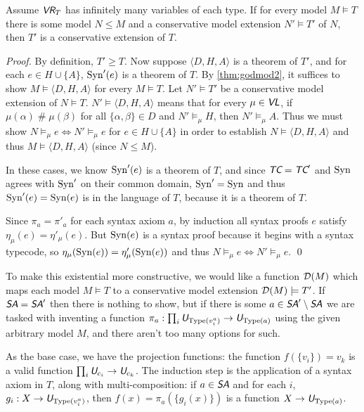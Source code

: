 \documentclass[runningheads,a4paper]{llncs}
\newcommand{\vr}{\textit{\textsf{VR}}} %
\newcommand{\tc}{\textit{\textsf{TC}}} %
\newcommand{\vl}{\textit{\textsf{VL}}} %
\newcommand{\uv}{\textit{\textsf{U}}} %
\newcommand{\sa}{\textit{\textsf{SA}}} %
\newcommand{\ang}[1]{\langle#1\rangle}
\newcommand{\type}{{\rm Type}}
\newcommand{\syn}{{\rm Syn}}
\newcommand{\fresh}{\mathbin{\#}}
\begin{document}
\begin{theorem}\label{thm:cmodel}
Assume $\vr_T$ has infinitely many variables of each type. If for every model $M\models T$ there is some model $N\le M$ and a conservative model extension $N'\models T'$ of $N$, then $T'$ is a conservative extension of $T$.
\end{theorem}
\begin{proof}By definition, $T'\ge T$. Now suppose $\ang{D,H,A}$ is a theorem of $T'$, and for each $e\in H\cup\{A\}$, $\syn'(e)$ is a theorem of $T$.  By \autoref{thm:godmod2}, it suffices to show $M\models\ang{D,H,A}$ for every $M\models T$. Let $N'\models T'$ be a conservative model extension of $N\models T$.  $N'\models\ang{D,H,A}$ means that for every $\mu\in\vl$, if $\mu(\alpha)\fresh\mu(\beta)$ for all $\{\alpha,\beta\}\in D$ and $N'\models_\mu H$, then $N'\models_\mu A$.  Thus we must show $N\models_\mu e\iff N'\models_\mu e$ for $e\in H\cup\{A\}$ in order to establish $N\models\ang{D,H,A}$ and thus $M\models\ang{D,H,A}$ (since $N\le M$).

In these cases, we know $\syn'(e)$ is a theorem of $T$, and since $\tc=\tc'$ and $\syn$ agrees with $\syn'$ on their common domain, $\syn'=\syn$ and thus $\syn'(e)=\syn(e)$ is in the language of $T$, because it is a theorem of $T$.

Since $\pi_a=\pi'_a$ for each syntax axiom $a$, by induction all syntax proofs $e$ satisfy $\eta_\mu(e)=\eta'_\mu(e)$. But $\syn(e)$ is a syntax proof because it begins with a syntax typecode, so $\eta_\mu(\syn(e))=\eta'_\mu(\syn(e))$ and thus $N\models_\mu e\iff N'\models_\mu e$.
\qed\end{proof}

To make this existential more constructive, we would like a function ${\cal D}(M)$ which maps each model $M\models T$ to a conservative model extension ${\cal D}(M)\models T'$. If $\sa=\sa'$ then there is nothing to show, but if there is some $a\in\sa'\setminus\sa$ we are tasked with inventing a function $\pi_a:\prod_i\uv_{\type(v^a_i)}\to\uv_{\type(a)}$ using the given arbitrary model $M$, and there aren't too many options for such.

As the base case, we have the projection functions: the function $f(\{v_i\})=v_k$ is a valid function $\prod_i\uv_{c_i}\to\uv_{c_k}$. The induction step is the application of a syntax axiom in $T$, along with multi-composition: if $a\in\sa$ and for each $i$, $g_i:X\to\uv_{\type(v^a_i)}$, then $f(x)=\pi_a(\{g_i(x)\})$ is a function $X\to\uv_{\type(a)}$.
\end{document}
